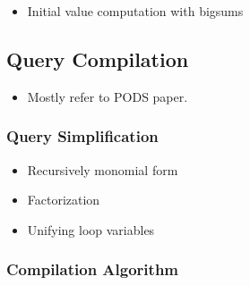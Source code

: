 \begin{itemize}
  \item Initial value computation with bigsums
\end{itemize}
\subsection{Query Compilation}

\begin{itemize}
  \item Mostly refer to PODS paper.
\end{itemize}

\subsubsection{Query Simplification}

\begin{itemize}
  \item Recursively monomial form
  \item Factorization
  \item Unifying loop variables
\end{itemize}

\subsubsection{Compilation Algorithm}
